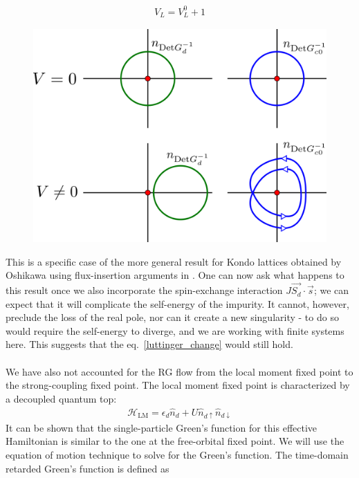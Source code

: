 \documentclass[twoside]{report}
\numberwithin{equation}{section}
\begin{document}
\begin{equation}\begin{aligned}
	\label{luttinger_change}
	V_L = V_L^0 + 1
\end{aligned}\end{equation}
\begin{figure}[htpb]
	\centering
	\includegraphics[scale=0.2]{../figures/luttinger_top_change.png}
\end{figure}
This is a specific case of the more general result for Kondo lattices obtained by Oshikawa using flux-insertion arguments in \cite{oshikawa}.
One can now ask what happens to this result once we also incorporate the spin-exchange interaction \(J \vec{S_d}\cdot\vec{s}\); we can expect that it will complicate the self-energy of the impurity. It cannot, however, preclude the loss of the real pole, nor can it create a new singularity - to do so would require the self-energy to diverge, and we are working with finite systems here. This suggests that the eq.~\ref{luttinger_change} would still hold.
\\\\We have also not accounted for the RG flow from the local moment fixed point to the strong-coupling fixed point. The local moment fixed point is characterized by a decoupled quantum top:
\begin{equation}\begin{aligned}
	\mathcal{H}_\text{LM} = \epsilon_d \hat n_d + U \hat n_{d \uparrow} \hat n_{d \downarrow}
\end{aligned}\end{equation}
It can be shown that the single-particle Green's function for this effective Hamiltonian is similar to the one at the free-orbital fixed point. We will use the equation of motion technique to solve for the Green's function. The time-domain retarded Green's function is defined as
\end{document}

